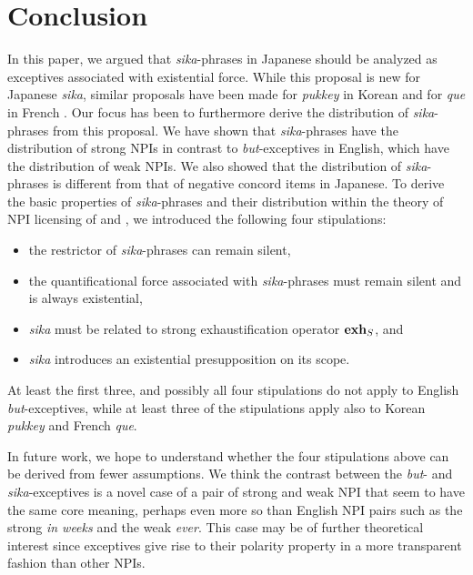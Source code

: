 \documentclass[output=paper]{langscibook}
\def\exh{\ifmmode\mathop{\textbf{exh}}\else\textbf{exh}\xspace\fi}
\begin{document}
\section{Conclusion}

In this paper, we argued that \emph{sika}-phrases in Japanese should be analyzed as exceptives associated with existential force.  While this proposal is new for Japanese \emph{sika}, similar proposals have been made for \emph{pukkey} in Korean \citep{sells01a} and for \emph{que} in French \citep{fintel07a}.  Our focus has been to furthermore derive the distribution of \emph{sika}-phrases from this proposal.  We have shown that \emph{sika}-phrases have the distribution of strong NPIs in contrast to \emph{but}-exceptives in English, which have the distribution of weak NPIs.  We also showed that the distribution of \emph{sika}-phrases is different from that of negative concord items in Japanese.   To derive the basic properties of \emph{sika}-phrases and their distribution within the theory of NPI licensing of \citet{gajewski11a} and \citet{chierchia13a}, we introduced the following four stipulations:

\begin{itemize}
    \item the restrictor of \emph{sika}-phrases can remain silent, 
    \item the quantificational force associated with \emph{sika}-phrases must remain silent and is always existential,
    \item \emph{sika} must be related to strong exhaustification operator $\exh_S$, and
    \item \emph{sika} introduces an existential presupposition on its scope.
\end{itemize}

At least the first three, and possibly all four stipulations do not apply to English \emph{but}-exceptives, while at least three of the stipulations apply also to Korean \emph{pukkey} and French \emph{que}.  

In future work, we hope to understand whether the four stipulations above can be derived from fewer assumptions.
We think the contrast between the \emph{but}- and \emph{sika}-exceptives is a novel case of a pair of strong and weak NPI that seem to have the same core meaning, perhaps even more so than English NPI pairs such as the strong \emph{in weeks} and the weak \emph{ever}. This case may be of further theoretical interest since exceptives  give rise to their polarity property in a more transparent fashion than other NPIs.
\end{document}
